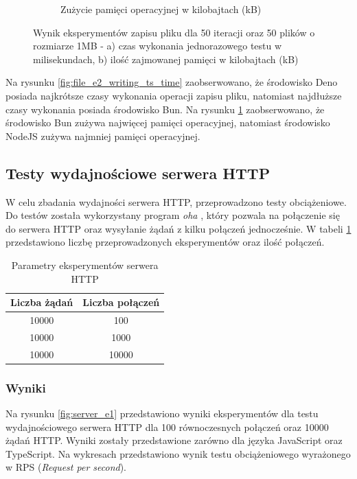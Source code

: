 \begin{figure}[H]
\begin{subfigure}[b]{0.44\textwidth}
    \caption{Zużycie pamięci operacyjnej w kilobajtach (kB)}
    \label{fig:file_e2_writing_ts_memory}
  \end{subfigure}
  \hfill
  \caption{Wynik eksperymentów zapisu pliku dla 50 iteracji oraz 50 plików o rozmiarze 1MB - a) czas wykonania jednorazowego testu w milisekundach, b) ilość zajmowanej pamięci w kilobajtach (kB)}
  \label{fig:file_e2_writing_ts}
\end{figure}

Na rysunku \ref{fig:file_e2_writing_ts_time} zaobserwowano, że środowisko Deno posiada najkrótsze czasy wykonania operacji zapisu pliku, natomiast najdłuższe czasy wykonania posiada środowisko Bun. Na rysunku \ref{fig:file_e2_writing_ts_memory} zaobserwowano, że środowisko Bun zużywa najwięcej pamięci operacyjnej, natomiast środowisko NodeJS zużywa najmniej pamięci operacyjnej.

\subsection{Testy wydajnościowe serwera HTTP}
W celu zbadania wydajności serwera HTTP, przeprowadzono testy obciążeniowe. Do testów została wykorzystany program \textit{oha} \cite{oha}, który pozwala na połączenie się do serwera HTTP oraz wysyłanie żądań z kilku połączeń jednocześnie. W tabeli \ref{tab:http_experiments} przedstawiono liczbę przeprowadzonych eksperymentów oraz ilość połączeń.

\begin{table}[H]
  \centering
  \caption{Parametry eksperymentów serwera HTTP}
  \begin{tabular}{|c|c|}
    \hline
    \textbf{Liczba żądań} & \textbf{Liczba połączeń}\\ \hline
    10000 & 100 \\ \hline
    10000 & 1000 \\ \hline
    10000 & 10000 \\ \hline
  \end{tabular}
  \label{tab:http_experiments}
\end{table}

\subsubsection{Wyniki}
Na rysunku \ref{fig:server_e1} przedstawiono wyniki eksperymentów dla testu wydajnościowego serwera HTTP dla 100 równoczesnych połączeń oraz 10000 żądań HTTP. Wyniki zostały przedstawione zarówno dla języka JavaScript oraz TypeScript. Na wykresach przedstawiono wynik testu obciążeniowego wyrażonego w RPS (\textit{Request per second}).

